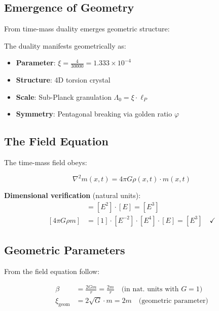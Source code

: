 	\subsection{Emergence of Geometry}
	
	From time-mass duality emerges geometric structure:
	
	\begin{keyresult}
		The duality manifests geometrically as:
		
		\begin{itemize}
			\item \textbf{Parameter}: $\xi = \frac{4}{30000} = 1.333 \times 10^{-4}$
			\item \textbf{Structure}: 4D torsion crystal
			\item \textbf{Scale}: Sub-Planck granulation $\Lambda_0 = \xi \cdot \ell_P$
			\item \textbf{Symmetry}: Pentagonal breaking via golden ratio $\varphi$
		\end{itemize}
	\end{keyresult}
	
	\subsection{The Field Equation}
	
	The time-mass field obeys:
	
	\begin{equation}
		\boxed{\nabla^2 m(x,t) = 4\pi G \rho(x,t) \cdot m(x,t)}
	\end{equation}
	
	\textbf{Dimensional verification} (natural units):
	\begin{align}
		[\nabla^2 m] &= [E^2] \cdot [E] = [E^3] \\
		[4\pi G \rho m] &= [1] \cdot [E^{-2}] \cdot [E^4] \cdot [E] = [E^3] \quad \checkmark
	\end{align}
	
	\subsection{Geometric Parameters}
	
	From the field equation follow:
	
	\begin{align}
		\beta &= \frac{2Gm}{r} = \frac{2m}{r} \quad \text{(in nat. units with } G=1\text{)} \\
		\xi_{\text{geom}} &= 2\sqrt{G} \cdot m = 2m \quad \text{(geometric parameter)}
	\end{align}
	
